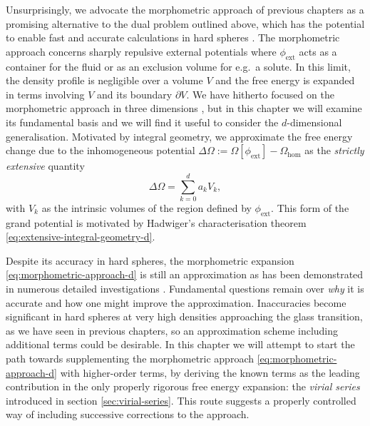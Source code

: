\documentclass[11pt,twoside]{report}
\begin{document}
Unsurprisingly, we advocate the morphometric approach of previous chapters as a promising alternative to the dual problem outlined above, which has the potential to enable fast and accurate calculations in hard spheres \cite{RothPRL2006,Hansen-GoosPRL2007,RobinsonPRL2019}.
The morphometric approach concerns sharply repulsive external potentials where $\phi_\mathrm{ext}$ acts as a container for the fluid or as an exclusion volume for e.g.\ a solute.
In this limit, the density profile is negligible over a volume $V$ and the free energy is expanded in terms involving $V$ and its boundary $\partial V$.
We have hitherto focused on the morphometric approach in three dimensions%
,
but in this chapter we will examine its fundamental basis and we will find it useful to consider the $d$-dimensional generalisation.
Motivated by integral geometry, we approximate the free energy change due to the inhomogeneous potential $\Delta \Omega := \Omega[\phi_\mathrm{ext}] - \Omega_\mathrm{hom}$ as the \emph{strictly extensive} quantity
\begin{equation}\label{eq:morphometric-approach-d}
  \Delta \Omega
  =
  \sum_{k=0}^d a_k V_k,
\end{equation}
with $V_k$ as the intrinsic volumes of the region defined by $\phi_\mathrm{ext}$.
This form of the grand potential is motivated by Hadwiger's characterisation theorem \eqref{eq:extensive-integral-geometry-d}.

Despite its accuracy in hard spheres, the morphometric expansion \eqref{eq:morphometric-approach-d} is still an approximation as has been demonstrated in numerous detailed investigations \cite{OettelEL2009,AshtonPRE2011,LairdPRE2012,BlokhuisPRE2013,UrrutiaPRE2014,Hansen-GoosJCP2014}.
Fundamental questions remain over \emph{why} it is accurate and how one might improve the approximation.
Inaccuracies become significant in hard spheres at very high densities approaching the glass transition, as we have seen in previous chapters, so an approximation scheme including additional terms could be desirable.
In this chapter we will attempt to start the path towards supplementing the morphometric approach \eqref{eq:morphometric-approach-d} with higher-order terms, by deriving the known terms as the leading contribution in the only properly rigorous free energy expansion: the \emph{virial series} introduced in section \ref{sec:virial-series}.
This route suggests a properly controlled way of including successive corrections to the approach.
\end{document}
